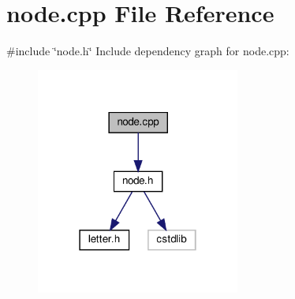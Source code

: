 \section{node.\+cpp File Reference}
\label{node_8cpp}
{\ttfamily \#include \char`\"{}node.\+h\char`\"{}}\newline
Include dependency graph for node.\+cpp\+:
\nopagebreak
\begin{figure}[H]
\begin{center}
\leavevmode
\includegraphics[width=190pt]{node_8cpp__incl}
\end{center}
\end{figure}
